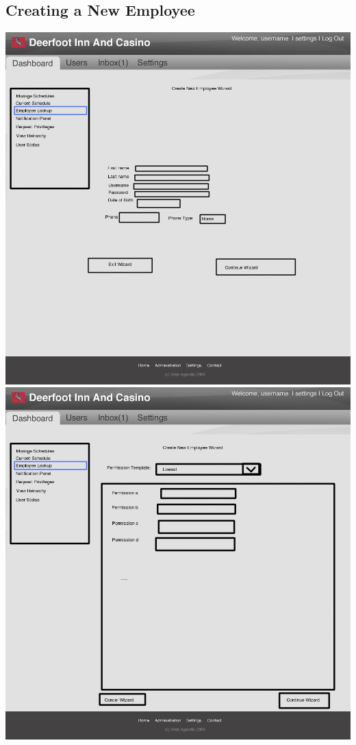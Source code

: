 \documentclass[letterpaper,12pt]{report}
\begin{document}
\begin{landscape}
\section{Creating a New Employee}
\begin{center}
 \includegraphics[scale=0.3]{prototypes/Screen4.png}
 \includegraphics[scale=0.3]{prototypes/Screen5.png}
\end{center}
\newpage


\end{landscape}
\end{document}
